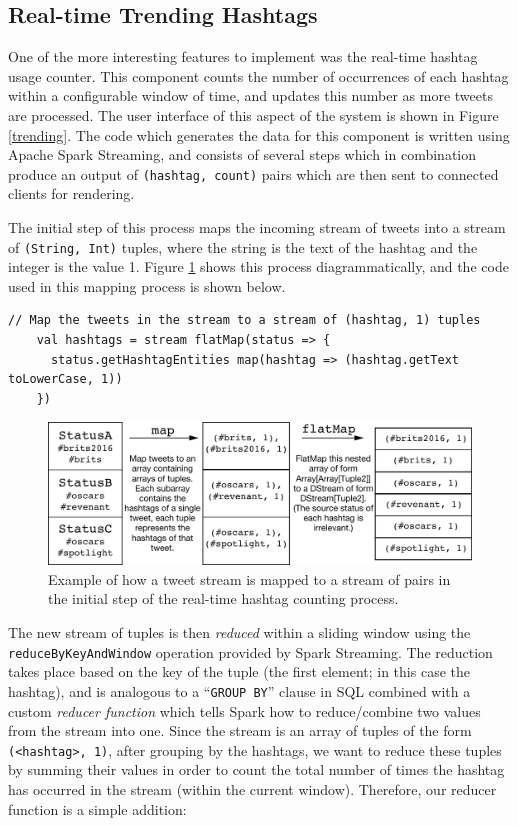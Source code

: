 \documentclass{l4proj}
\newcommand{\code}[1]{\texttt{#1}}
\begin{document}
\subsection{Real-time Trending Hashtags}

One of the more interesting features to implement was the real-time hashtag usage counter. This component counts the number of occurrences of each hashtag within a configurable window of time, and updates this number as more tweets are processed. The user interface of this aspect of the system is shown in Figure \ref{trending}. The code which generates the data for this component is written using Apache Spark Streaming, and consists of several steps which in combination produce an output of \code{(hashtag, count)} pairs which are then sent to connected clients for rendering.

The initial step of this process maps the incoming stream of tweets into a stream of \code{(String, Int)} tuples, where the string is the text of the hashtag and the integer is the value 1. Figure \ref{mappingstep} shows this process diagrammatically, and the code used in this mapping process is shown below.

\begin{lstlisting}[caption=Initial mapping of tweets to hashtags pairs.]
    // Map the tweets in the stream to a stream of (hashtag, 1) tuples
    val hashtags = stream flatMap(status => {
      status.getHashtagEntities map(hashtag => (hashtag.getText toLowerCase, 1))
    })
\end{lstlisting}

\begin{figure}
\centering
\includegraphics[scale=0.75]{mappingstep.pdf}
\caption{Example of how a tweet stream is mapped to a stream of pairs in the initial step of the real-time hashtag counting process.}
\label{mappingstep}
\end{figure}
               
The new stream of tuples is then \textit{reduced} within a sliding window using the \code{reduceByKeyAndWindow} operation provided by Spark Streaming. The reduction takes place based on the key of the tuple (the first element; in this case the hashtag), and is analogous to a ``\code{GROUP BY}'' clause in SQL combined with a custom \textit{reducer function} which tells Spark how to reduce/combine two values from the stream into one. Since the stream is an array of tuples of the form \code{(<hashtag>, 1)}, after grouping by the hashtags, we want to reduce these tuples by summing their values in order to count the total number of times the hashtag has occurred in the stream (within the current window). Therefore, our reducer function is a simple addition:
\end{document}
